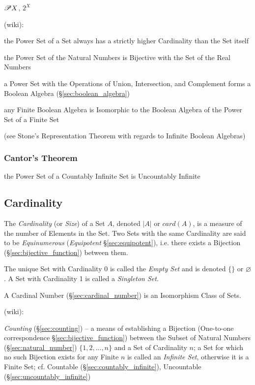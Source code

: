 $\mathscr{P}{X}$, $2^X$

(wiki):

the Power Set of a Set always has a strictly higher Cardinality than the Set
itself

the Power Set of the Natural Numbers is Bijective with the Set of the Real
Numbers

a Power Set with the Operations of Union, Intersection, and Complement forms a
Boolean Algebra (\S\ref{sec:boolean_algebra})

any Finite Boolean Algebra is Isomorphic to the Boolean Algebra of the Power Set
of a Finite Set

(see Stone's Representation Theorem with regards to Infinite Boolean Algebras)



\subsubsection{Cantor's Theorem}\label{sec:cantors_theorem}

the Power Set of a Countably Infinite Set is Uncountably Infinite



\subsection{Cardinality}\label{sec:cardinality}

The \emph{Cardinality} (or \emph{Size}) of a Set $A$, denoted $|A|$ or
$card(A)$, is a measure of the number of Elements in the Set. Two Sets with the
same Cardinality are said to be \emph{Equinumerous} (\emph{Equipotent}
\S\ref{sec:equipotent}), i.e. there exists a Bijection
(\S\ref{sec:bijective_function}) between them.

The unique Set with Cardinality 0 is called the \emph{Empty Set} and is denoted
$\{\}$ or $\varnothing$. A Set with Cardinality 1 is called a \emph{Singleton
  Set}.

A Cardinal Number (\S\ref{sec:cardinal_number}) is an Isomorphism Class of Sets.

(wiki):

\emph{Counting} (\S\ref{sec:counting}) -- a means of establishing a Bijection
(One-to-one correspondence \S\ref{sec:bijective_function}) between the Subset of
Natural Numbers (\S\ref{sec:natural_number}) $\{1,2,\ldots,n\}$ and a Set of
Cardinality $n$; a Set for which no such Bijection exists for any Finite $n$ is
called an \emph{Infinite Set}, otherwise it is a Finite Set;
cf. Countable (\S\ref{sec:countably_infinite}), Uncountable
(\S\ref{sec:uncountably_infinite})

